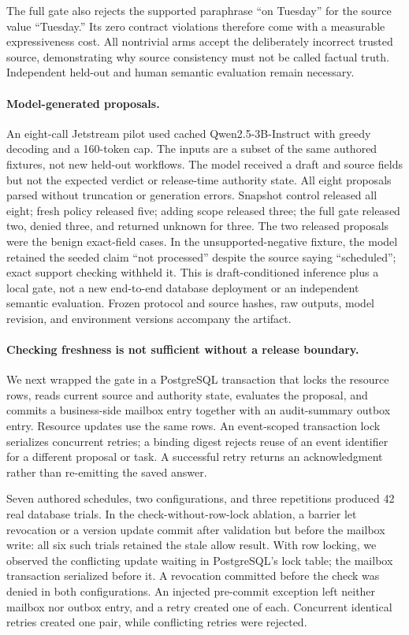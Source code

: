 The full gate also rejects the supported paraphrase ``on Tuesday'' for the source
value ``Tuesday.'' Its zero contract violations therefore come with a measurable
expressiveness cost. All nontrivial arms accept the deliberately incorrect
trusted source, demonstrating why source consistency must not be called factual
truth. Independent held-out and human semantic evaluation remain necessary.

\paragraph{Model-generated proposals.}
An eight-call Jetstream pilot used cached Qwen2.5-3B-Instruct with greedy decoding
and a 160-token cap. The inputs are a subset of the same authored fixtures, not
new held-out workflows. The model received a draft and source fields but not the
expected verdict or release-time authority state. All eight proposals parsed
without truncation or generation errors. Snapshot control released all eight;
fresh policy released five; adding scope released three; the full gate released
two, denied three, and returned unknown for three. The two released proposals
were the benign exact-field cases. In the unsupported-negative fixture, the
model retained the seeded claim ``not processed'' despite the source saying
``scheduled''; exact support checking withheld it. This is draft-conditioned
inference plus a local gate, not a new end-to-end database deployment or an
independent semantic evaluation. Frozen protocol and source hashes, raw outputs,
model revision, and environment versions accompany the artifact.

\paragraph{Checking freshness is not sufficient without a release boundary.}
We next wrapped the gate in a PostgreSQL transaction that locks the resource rows,
reads current source and authority state, evaluates the proposal, and commits a
business-side mailbox entry together with an audit-summary outbox entry. Resource
updates use the same rows. An event-scoped transaction lock serializes concurrent
retries; a binding digest rejects reuse of an event identifier for a different
proposal or task. A successful retry returns an acknowledgment rather than
re-emitting the saved answer.

Seven authored schedules, two configurations, and three repetitions produced
42 real database trials. In the check-without-row-lock ablation, a barrier let
revocation or a version update commit after validation but before the mailbox
write: all six such trials retained the stale allow result. With row locking,
we observed the conflicting update waiting in PostgreSQL's lock table; the
mailbox transaction serialized before it. A revocation committed before the
check was denied in both configurations. An injected pre-commit exception left
neither mailbox nor outbox entry, and a retry created one of each. Concurrent
identical retries created one pair, while conflicting retries were rejected.

